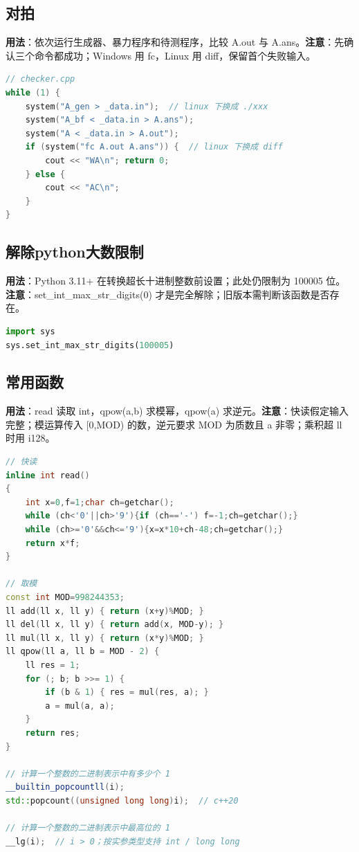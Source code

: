 \documentclass[a4paper,9pt]{extarticle}
\begin{document}
\subsection{对拍}

\textbf{用法}：依次运行生成器、暴力程序和待测程序，比较 A.out 与 A.ans。\textbf{注意}：先确认三个命令都成功；Windows 用 fc，Linux 用 diff，保留首个失败输入。

\begin{lstlisting}[language={C++}]
// checker.cpp
while (1) {
	system("A_gen > _data.in");  // linux 下换成 ./xxx
	system("A_bf < _data.in > A.ans");
	system("A < _data.in > A.out");
	if (system("fc A.out A.ans")) {  // linux 下换成 diff
		cout << "WA\n"; return 0;
	} else {
		cout << "AC\n";
	}
}
\end{lstlisting}

\subsection{解除python大数限制}

\textbf{用法}：Python 3.11+ 在转换超长十进制整数前设置；此处仍限制为 100005 位。\textbf{注意}：set\_\allowbreak{}int\_\allowbreak{}max\_\allowbreak{}str\_\allowbreak{}digits(\allowbreak{}0) 才是完全解除；旧版本需判断该函数是否存在。

\begin{lstlisting}[language={Python}]
import sys
sys.set_int_max_str_digits(100005)
\end{lstlisting}

\subsection{常用函数}

\textbf{用法}：read 读取 int，qpow(\allowbreak{}a,\allowbreak{}b) 求模幂，qpow(a) 求逆元。\textbf{注意}：快读假定输入完整；模运算传入 [0,MOD) 的数，逆元要求 MOD 为质数且 a 非零；乘积超 ll 时用 i128。

\begin{lstlisting}[language={C++}]
// 快读
inline int read()
{
	int x=0,f=1;char ch=getchar();
	while (ch<'0'||ch>'9'){if (ch=='-') f=-1;ch=getchar();}
	while (ch>='0'&&ch<='9'){x=x*10+ch-48;ch=getchar();}
	return x*f;
}

// 取模
const int MOD=998244353;
ll add(ll x, ll y) { return (x+y)%MOD; }
ll del(ll x, ll y) { return add(x, MOD-y); }
ll mul(ll x, ll y) { return (x*y)%MOD; }
ll qpow(ll a, ll b = MOD - 2) {
	ll res = 1;
	for (; b; b >>= 1) {
		if (b & 1) { res = mul(res, a); }
		a = mul(a, a);
	}
	return res;
}

// 计算一个整数的二进制表示中有多少个 1
__builtin_popcountll(i);
std::popcount((unsigned long long)i);  // c++20

// 计算一个整数的二进制表示中最高位的 1
__lg(i);  // i > 0；按实参类型支持 int / long long
\end{lstlisting}
\end{document}
